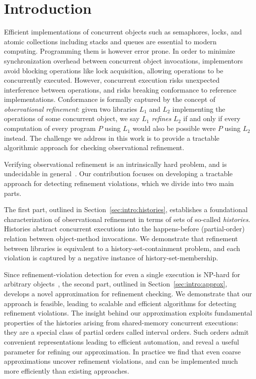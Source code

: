 \section{Introduction}

Efficient implementations of concurrent objects such as semaphores, locks, and
atomic collections including stacks and queues are essential to modern
computing. Programming them is however error prone. In order to minimize
synchronization overhead between concurrent object invocations, implementors
avoid blocking operations like lock acquisition, allowing operations to be
concurrently executed. However, concurrent execution risks unexpected
interference between operations, and risks breaking conformance to reference
implementations. Conformance is formally captured by the concept of
\emph{observational refinement}: given two libraries $L_1$ and $L_2$
implementing the operations of some concurrent object, we say $L_1$
\emph{refines} $L_2$ if and only if every computation of every program $P$
using $L_1$ would also be possible were $P$ using $L_2$ instead. The challenge
we address in this work is to provide a tractable algorithmic approach for
checking observational refinement.

Verifying observational refinement is an intrinsically hard problem, and is
undecidable in general~\cite{conf/esop/BouajjaniEEH13}. Our contribution
focuses on developing a tractable approach for detecting refinement violations,
which we divide into two main parts.

The first part, outlined in Section~\ref{sec:intro:histories}, establishes a
foundational characterization of observational refinement in terms of sets of
so-called \emph{histories}. Histories abstract concurrent executions into the
happens-before (partial-order) relation between object-method invocations. We
demonstrate that refinement between libraries is equivalent to a
history-set-containment problem, and each violation is captured by a negative
instance of history-set-membership.

Since refinement-violation detection for even a single execution is NP-hard for
arbitrary objects~\cite{journals/siamcomp/GibbonsK97}, the second part,
outlined in Section~\ref{sec:intro:approx}, develops a novel approximation for
refinement checking. We demonstrate that our approach is feasible, leading to
scalable and efficient algorithms for detecting refinement violations. The
insight behind our approximation exploits fundamental properties of the
histories arising from shared-memory concurrent executions: they are a special
class of partial orders called interval orders. Such orders admit convenient
representations leading to efficient automation, and reveal a useful parameter
for refining our approximation. In practice we find that even coarse
approximations uncover refinement violations, and can be implemented much more
efficiently than existing approaches.


